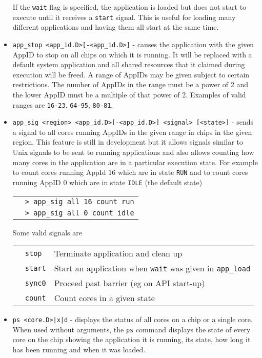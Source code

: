 \begin{itemize}
If the \texttt{wait} flag is specified, the application is loaded
but does not start to execute until it receives a \texttt{start}
signal. This is useful for loading many different applications
and having them all start at the same time.

\item
\texttt{app\_stop <app\_id.D>[-<app\_id.D>]} - causes the application
with the given AppID to stop on all chips on which it is running. It
will be replaced with a default system application and all shared
resources that it claimed during execution will be freed. A range of
AppIDs may be given subject to certain restrictions. The number of
AppIDs in the range must be a power of 2 and the lower AppID must
be a multiple of that power of 2. Examples of valid ranges are
\texttt{16-23}, \texttt{64-95}, \texttt{80-81}. 

\item
\texttt{app\_sig <region> <app\_id.D>[-<app\_id.D>] <signal>
[<state>]} - sends a signal to all cores running AppIDs in the given
range in chips in the given region. This feature is still in
development but it allows signals similar to Unix signals to be sent
to running applications and also allows counting how many cores in the
application are in a particular execution state. For example to count
cores running AppId 16 which are in state \texttt{RUN} and to count
cores running AppID 0 which are in state \texttt{IDLE} (the default
state)

\begin{tabular}{p{1cm} p{10cm}}
& \texttt{> app\_sig all 16 count run} \\
& \texttt{> app\_sig all 0 count idle} \\
\end{tabular}

Some valid signals are

\begin{tabular}{p{0.5cm} p{2cm} p{12cm}}
& \texttt{stop} & Terminate application and clean up \\
& \texttt{start} & Start an application when \texttt{wait} was given in \texttt{app\_load} \\
& \texttt{sync0} & Proceed past barrier (eg on API start-up) \\
& \texttt{count} & Count cores in a given state \\
\end{tabular}

\item
\texttt{ps <core.D>|x|d} - displays the status of all cores on a chip or
a single core. When used without arguments, the \texttt{ps} command
displays the state of every core on the chip showing the application
it is running, its state, how long it has been running and when it was
loaded.


\end{itemize}
